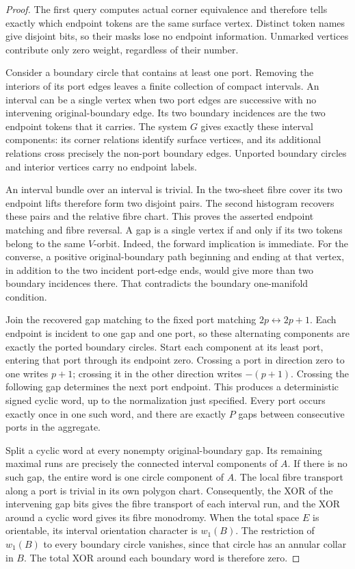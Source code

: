 \begin{proof}
The first query computes actual corner equivalence and therefore tells
exactly which endpoint tokens are the same surface vertex.  Distinct
token names give disjoint bits, so their masks lose no endpoint information.
Unmarked vertices contribute only zero weight, regardless of their number.

Consider a boundary circle that contains at least one port.  Removing the
interiors of its port edges leaves a finite collection of compact intervals.
An interval can be a single vertex when two port edges are successive with
no intervening original-boundary edge.  Its two boundary incidences are the
two endpoint tokens that it carries.  The system $G$ gives exactly these
interval components: its corner relations identify surface vertices, and
its additional relations cross precisely the non-port boundary edges.
Unported boundary circles and interior vertices carry no endpoint labels.

An interval bundle over an interval is trivial.  In the two-sheet fibre
cover its two endpoint lifts therefore form two disjoint pairs.  The second
histogram recovers these pairs and the relative fibre chart.  This proves
the asserted endpoint matching and fibre reversal.  A gap is a single
vertex if and only if its two tokens belong to the same $V$-orbit.  Indeed,
the forward implication is immediate.  For the converse, a positive
original-boundary path beginning and ending at that vertex, in addition to
the two incident port-edge ends, would give more than two boundary
incidences there.  That contradicts the boundary one-manifold condition.

Join the recovered gap matching to the fixed port matching
$2p\leftrightarrow2p+1$.  Each endpoint is incident to one gap and one port,
so these alternating components are exactly the ported boundary circles.
Start each component at its least port, entering that port through its
endpoint zero.  Crossing a port in direction zero to one writes $p+1$;
crossing it in the other direction writes $-(p+1)$.  Crossing the following
gap determines the next port endpoint.  This produces a deterministic
signed cyclic word, up to the normalization just specified.  Every port
occurs exactly once in one such word, and there are exactly $P$ gaps
between consecutive ports in the aggregate.

Split a cyclic word at every nonempty original-boundary gap.  Its remaining
maximal runs are precisely the connected interval components of $A$.
If there is no such gap, the entire word is one circle component of $A$.
The local fibre transport along a port is trivial in its own polygon
chart.  Consequently, the XOR of the intervening gap bits gives the fibre
transport of each interval run, and the XOR around a cyclic word gives
its fibre monodromy.  When the total space $E$ is orientable, its interval
orientation character is $w_1(B)$.  The restriction of $w_1(B)$ to every
boundary circle vanishes, since that circle has an annular collar in $B$.
The total XOR around each boundary word is therefore zero.


\end{proof}
